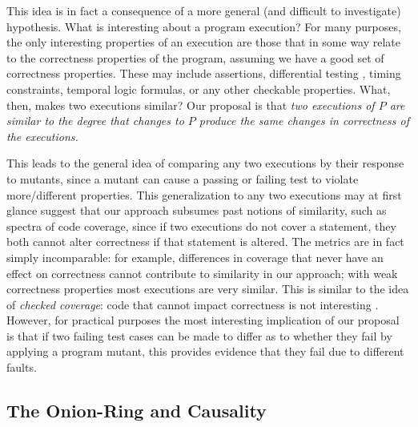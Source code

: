 This idea is in fact a consequence of a more general (and difficult to investigate) hypothesis.  What is interesting about a program execution?  For many purposes, the only interesting properties of an execution are those that in some way relate to the correctness properties of the program, assuming we have a good set of correctness properties.  These may include assertions, differential testing \cite{Differential,ICSEDiff}, timing constraints, temporal logic formulas, or any other checkable properties.  What, then, makes two executions similar?  Our proposal is that \emph{two executions of $P$ are similar to the degree that changes to $P$ produce the same changes in correctness of the executions.}

This leads to the general idea of comparing any two executions by their response to mutants, since a mutant can cause a passing or failing test to violate more/different properties.   
This generalization to any two executions may at first glance suggest that our approach subsumes past notions of similarity, such as spectra of code coverage, since if two executions do not cover a statement, they both cannot alter correctness if that statement is altered.  The metrics are in fact simply incomparable:  for example, differences in coverage that never have an effect on correctness cannot contribute to similarity in our approach; with weak correctness properties most executions are very similar.  This is similar to the idea of \emph{checked coverage}:  code that cannot impact correctness is not interesting \cite{CheckCov}.  
However, for practical purposes the most interesting implication of our proposal is that if two failing test cases can be made to differ as to whether they fail by applying a program mutant, this provides evidence that they fail due to different faults.


\subsection{The Onion-Ring and Causality}

